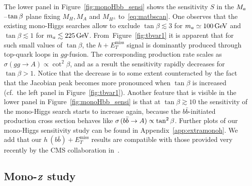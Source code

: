 \documentclass[a4paper, 11pt,notoc]{article}
\newcommand{\MET}{\ensuremath{E_T^\mathrm{miss}}\xspace}
\newcommand{\mA}{\ensuremath{M_{A}}\xspace}
\newcommand{\ma}{\ensuremath{M_{a}}\xspace}
\newcommand{\mH}{\ensuremath{M_{H}}\xspace}
\newcommand{\mHc}{\ensuremath{M_{H^{\pm}}}\xspace}
\def\bm#1{\mbox{\boldmath$#1$\unboldmath}}
\begin{document}
The lower panel in Figure~\ref{fig:monoHbb_sensi} shows the sensitivity $S$ in the $\ma\hspace{0.25mm}$--$\hspace{0.25mm}\tan \beta$ plane fixing  $\mH, \mA$ and  $\mHc$ to~\eqref{eq:matbscan}. One observes that the existing mono-Higgs searches allow to exclude $\tan \beta \lesssim 3$ for $m_a \simeq 100 \, {\rm GeV}$ and $\tan \beta \lesssim 1$ for $m_a \lesssim 225 \, {\rm GeV}$. From~Figure~\ref{fig:tbvar1} it is apparent that for such small values of $\tan \beta$, the $h + \MET$ signal is dominantly produced through top-quark loops in $gg$-fusion. The corresponding production rate scales as $\sigma \left ( gg \to A \right ) \propto \cot^2 \beta$, and as a result the sensitivity rapidly decreases for $\tan \beta > 1$. Notice that the decrease is to some extent counteracted by the fact that the Jacobian peak becomes more pronounced when  $\tan \beta$ is increased (cf.~the left panel in Figure~\ref{fig:tbvar1}). Another feature that is visible in the  lower panel in Figure~\ref{fig:monoHbb_sensi}  is that at $\tan \beta \gtrsim 10$ the sensitivity of the mono-Higgs search  starts to increase again, because the $b \bar b$-initiated production cross section behaves like $\sigma \hspace{0.5mm} ( b \bar b \to A  ) \propto \tan^2 \beta$. Further plots of our mono-Higgs sensitivity study can be found in Appendix~\ref{app:extramonoh}.  We add that our $h \, (b \bar b) + \MET$ results are compatible with those provided very recently by the CMS collaboration in~\cite{CMS-PAS-EXO-16-050}. 

\subsection[Mono-$Z$ study]{Mono-$\bm{Z}$ study}
\label{sec:sensi_monozll}
\end{document}
